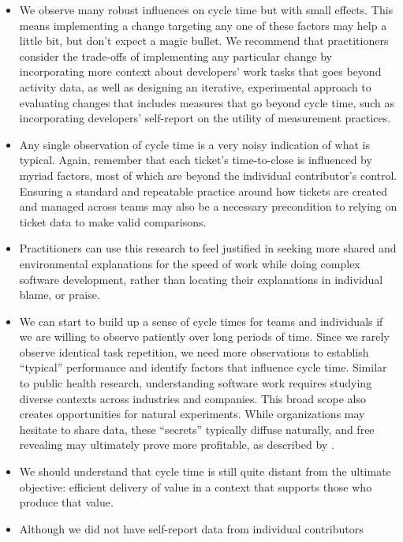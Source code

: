 \documentclass[manuscript,screen,review]{acmart}
\providecommand{\tightlist}{%
  \setlength{\itemsep}{0pt}\setlength{\parskip}{0pt}}\usepackage{longtable,booktabs,array}
\begin{document}
\begin{itemize}
\tightlist
\item
  We observe many robust influences on cycle time but with small
  effects. This means implementing a change targeting any one of these
  factors may help a little bit, but don't expect a magic bullet. We
  recommend that practitioners consider the trade-offs of implementing
  any particular change by incorporating more context about developers'
  work tasks that goes beyond activity data, as well as designing an
  iterative, experimental approach to evaluating changes that includes
  measures that go beyond cycle time, such as incorporating developers'
  self-report on the utility of measurement practices.
\item
  Any single observation of cycle time is a very noisy indication of
  what is typical. Again, remember that each ticket's time-to-close is
  influenced by myriad factors, most of which are beyond the individual
  contributor's control. Ensuring a standard and repeatable practice
  around how tickets are created and managed across teams may also be a
  necessary precondition to relying on ticket data to make valid
  comparisons.
\item
  Practitioners can use this research to feel justified in seeking more
  shared and environmental explanations for the speed of work while
  doing complex software development, rather than locating their
  explanations in individual blame, or praise.
\item
  We can start to build up a sense of cycle times for teams and
  individuals if we are willing to observe patiently over long periods
  of time. Since we rarely observe identical task repetition, we need
  more observations to establish ``typical'' performance and identify
  factors that influence cycle time. Similar to public health research,
  understanding software work requires studying diverse contexts across
  industries and companies. This broad scope also creates opportunities
  for natural experiments. While organizations may hesitate to share
  data, these ``secrets'' typically diffuse naturally, and free
  revealing may ultimately prove more profitable, as described by
  \citet{vonhippelFreeRevealingPrivatecollective2006}.
\item
  We should understand that cycle time is still quite distant from the
  ultimate objective: efficient delivery of value in a context that
  supports those who produce that value.
\item
  Although we did not have self-report data from individual contributors

\end{itemize}
\end{document}
